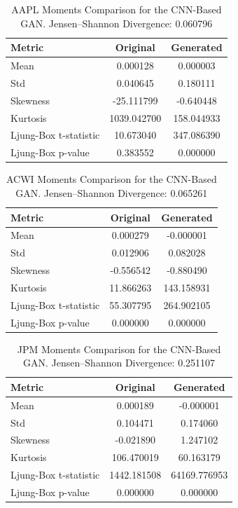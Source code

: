 \documentclass{article}
\begin{document}
\begin{table}[h!]
\centering
\begin{tabular}{lcc}
\hline
\textbf{Metric} & \textbf{Original} & \textbf{Generated} \\
\hline
Mean     & 0.000128 & 0.000003 \\
Std      & 0.040645 & 0.180111 \\
Skewness & -25.111799 & -0.640448 \\
Kurtosis & 1039.042700 & 158.044933 \\
Ljung-Box t-statistic & 10.673040 & 347.086390 \\
Ljung-Box p-value & 0.383552 & 0.000000 \\
\hline
\end{tabular}
\caption{AAPL Moments Comparison for the CNN-Based GAN.
Jensen--Shannon Divergence: 0.060796}
\label{tab:aapl_cnn}
\end{table}

\begin{table}[h!]
\centering
\begin{tabular}{lcc}
\hline
\textbf{Metric} & \textbf{Original} & \textbf{Generated} \\
\hline
Mean     & 0.000279 & -0.000001 \\
Std      & 0.012906 & 0.082028 \\
Skewness & -0.556542 & -0.880490 \\
Kurtosis & 11.866263 & 143.158931 \\
Ljung-Box t-statistic & 55.307795 & 264.902105 \\
Ljung-Box p-value & 0.000000 & 0.000000 \\
\hline
\end{tabular}
\caption{ACWI Moments Comparison for the CNN-Based GAN.
Jensen--Shannon Divergence: 0.065261}
\label{tab:acwi_cnn}
\end{table}

\begin{table}[h!]
\centering
\begin{tabular}{lcc}
\hline
\textbf{Metric} & \textbf{Original} & \textbf{Generated} \\
\hline
Mean     & 0.000189 & -0.000001 \\
Std      & 0.104471 & 0.174060 \\
Skewness & -0.021890 & 1.247102 \\
Kurtosis & 106.470019 & 60.163179 \\
Ljung-Box t-statistic & 1442.181508 & 64169.776953 \\
Ljung-Box p-value & 0.000000 & 0.000000 \\
\hline
\end{tabular}
\caption{JPM Moments Comparison for the CNN-Based GAN.
Jensen--Shannon Divergence: 0.251107}
\label{tab:jpm_cnn}
\end{table}
\end{document}
